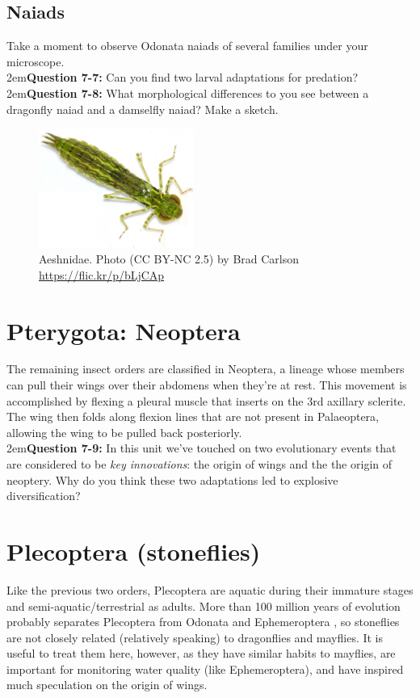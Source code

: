 \documentclass[letterpaper, 11pt]{article}
\begin{document}
\subsection*{Naiads}
Take a moment to observe Odonata naiads of several families under your microscope. \\

\hangindent2em\textbf{Question 7-7:} Can you find two larval adaptations for predation?\\

\hangindent2em\textbf{Question 7-8:} What morphological differences to you see between a dragonfly naiad and a damselfly naiad? Make a sketch.

\begin{figure}[ht!]
  \centering
    \includegraphics[width=0.45\textwidth]{AeshnidLarva}
  \caption{Aeshnidae. Photo (CC BY-NC 2.5) by Brad Carlson \url{https://flic.kr/p/bLjCAp}}
  \label{fig:OdonataLarva}
\end{figure}

\FloatBarrier

\section*{Pterygota: Neoptera}
The remaining insect orders are classified in Neoptera, a lineage whose members can pull their wings over their abdomens when they're at rest. This movement is accomplished by flexing a pleural muscle that inserts on the 3rd axillary sclerite. The wing then folds along flexion lines that are not present in Palaeoptera, allowing the wing to be pulled back posteriorly.\\

\hangindent2em\textbf{Question 7-9:} In this unit we've touched on two evolutionary events that are considered to be \textit{key innovations}: the origin of wings and the the origin of neoptery. Why do you think these two adaptations led to explosive diversification?

\section{Plecoptera (stoneflies)}
Like the previous two orders, Plecoptera are aquatic during their immature stages and semi-aquatic/terrestrial as adults. More than 100 million years of evolution probably separates Plecoptera from Odonata and Ephemeroptera \citep{Misof763}, so stoneflies are not closely related (relatively speaking) to dragonflies and mayflies. It is useful to treat them here, however, as they have similar habits to mayflies, are important for monitoring water quality (like Ephemeroptera), and have inspired much speculation on the origin of wings.
\end{document}
